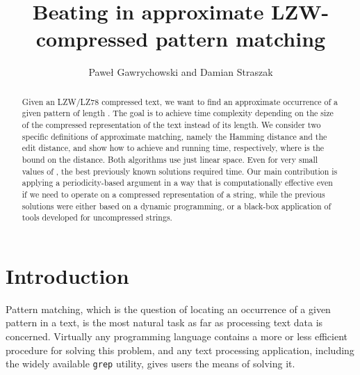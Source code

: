 \documentclass[runningheads]{llncs}
\begin{document}
\title{Beating  in approximate LZW-compressed pattern matching}

\author{Pawe\l{} Gawrychowski and Damian Straszak}
\authorrunning{}

\maketitle

\begin{abstract}
Given an LZW/LZ78 compressed text, we want to find an approximate occurrence of a given pattern of length . The goal is to achieve time complexity
depending on the size  of the compressed representation of the text instead of its length. We consider two specific definitions of approximate matching, namely the Hamming distance and the edit distance, and show how to achieve  and  running time, respectively, where  is the bound on the distance. Both
algorithms use just linear space.
Even for very small values of , the best previously known solutions required  time. Our main contribution is applying a periodicity-based argument in a way that is computationally effective even if we need to operate on a compressed representation of a string, while the previous solutions were either based on a dynamic programming, or a black-box application of tools developed for uncompressed strings.
\end{abstract}

\section{Introduction}

Pattern matching, which is the question of locating an occurrence of a given pattern in a text, is the most natural task as far as processing text data is concerned. Virtually any programming language contains a more or less efficient procedure for solving this problem, and any text processing application, including the widely available \texttt{grep} utility, gives users the means of solving it.
\end{document}
